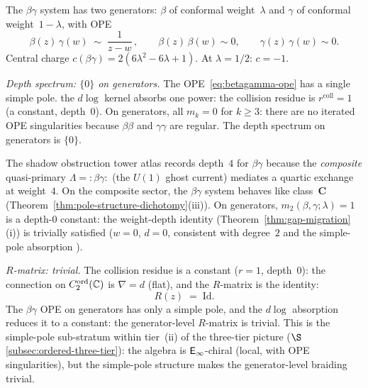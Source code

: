 \begin{computation}%
\label{comp:betagamma-ordered-bar}%
%
%
%
The $\beta\gamma$ system has two generators:
$\beta$ of conformal weight~$\lambda$ and
$\gamma$ of conformal weight~$1-\lambda$, with OPE
\begin{equation}\label{eq:betagamma-ope}
\beta(z)\,\gamma(w)
\;\sim\;
\frac{1}{z-w}\,,
\qquad
\beta(z)\,\beta(w) \sim 0,
\qquad
\gamma(z)\,\gamma(w) \sim 0.
\end{equation}
Central charge $c(\beta\gamma) = 2(6\lambda^2 - 6\lambda + 1)$.
At $\lambda = 1/2$: $c = -1$.

\smallskip
\noindent
\emph{Depth spectrum: $\{0\}$ on generators.}
The OPE~\eqref{eq:betagamma-ope} has a single simple pole.
the $d\log$ kernel absorbs one power: the
collision residue is $r^{\mathrm{coll}} = 1$ (a constant,
depth~$0$). On generators, all $m_k = 0$ for
$k \ge 3$: there are no iterated OPE singularities
because $\beta\beta$ and $\gamma\gamma$ are regular.
The depth spectrum on generators is $\{0\}$.

The shadow obstruction tower atlas records depth~$4$ for $\beta\gamma$
because the \emph{composite} quasi-primary
$\Lambda = {:}\beta\gamma{:}$ (the $U(1)$ ghost current)
mediates a quartic exchange at weight~$4$. On the
composite sector, the $\beta\gamma$ system behaves like
class~$\mathbf{C}$
(Theorem~\ref{thm:pole-structure-dichotomy}(iii)).
On generators, $m_2(\beta,\gamma;\lambda) = 1$ is a depth-$0$ constant: the weight-depth identity (Theorem~\ref{thm:gap-migration}(i)) is trivially satisfied ($w = 0$, $d = 0$, consistent with degree~$2$ and the simple-pole absorption ).

\smallskip
\noindent
\emph{$R$-matrix: trivial.}
The collision residue is a constant ($r = 1$, depth~$0$):
the connection on $C_2^{\mathrm{ord}}(\mathbb{C})$ is
$\nabla = d$ (flat), and the $R$-matrix is the identity:
\begin{equation}\label{eq:betagamma-R}
R(z) \;=\; \mathrm{Id}.
\end{equation}
The $\beta\gamma$ OPE on generators has only a simple pole,
and the $d\log$ absorption reduces it to a constant:
the generator-level $R$-matrix is trivial. This is the
simple-pole sub-stratum within tier~(ii) of the three-tier
picture ($\S$\ref{subsec:ordered-three-tier}):
the algebra is $\mathsf{E}_{\infty}$-chiral (local, with OPE singularities),
but the simple-pole structure makes the generator-level
braiding trivial.


\end{computation}

